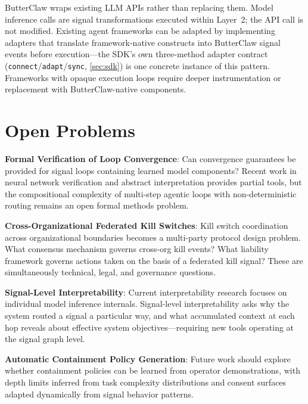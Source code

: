 \documentclass[11pt,a4paper]{article}
\begin{document}
ButterClaw wraps existing LLM APIs rather than replacing them. Model inference calls are signal
transformations executed within Layer~2; the API call is not modified. Existing agent frameworks
can be adapted by implementing adapters that translate framework-native constructs into
ButterClaw signal events before execution---the SDK's own three-method adapter contract
(\texttt{connect}/\texttt{adapt}/\texttt{sync}, \cref{sec:sdk}) is one concrete instance of this
pattern. Frameworks with opaque execution loops require deeper instrumentation or replacement with
ButterClaw-native components.

\section{Open Problems}
\label{sec:openproblems}

\textbf{Formal Verification of Loop Convergence}: Can convergence guarantees be provided for
signal loops containing learned model components? Recent work in neural network verification and
abstract interpretation provides partial tools, but the compositional complexity of multi-step
agentic loops with non-deterministic routing remains an open formal methods problem.

\textbf{Cross-Organizational Federated Kill Switches}: Kill switch coordination across
organizational boundaries becomes a multi-party protocol design problem. What consensus mechanism
governs cross-org kill events? What liability framework governs actions taken on the basis of a
federated kill signal? These are simultaneously technical, legal, and governance questions.

\textbf{Signal-Level Interpretability}: Current interpretability research focuses on individual
model inference internals. Signal-level interpretability asks why the system routed a signal a
particular way, and what accumulated context at each hop reveals about effective system
objectives---requiring new tools operating at the signal graph level.

\textbf{Automatic Containment Policy Generation}: Future work should explore whether containment
policies can be learned from operator demonstrations, with depth limits inferred from task
complexity distributions and consent surfaces adapted dynamically from signal behavior patterns.

\end{document}
